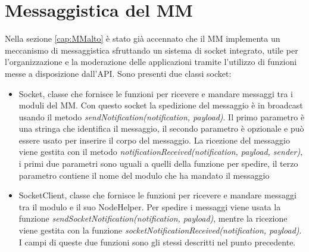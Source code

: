 \section{Messaggistica del MM}\label{cap:MMmess}
Nella sezione \ref{cap:MMalto} \`e stato gi\`a accennato che il MM implementa un meccanismo di messaggistica sfruttando un sistema di socket integrato,
utile per l'organizzazione e la moderazione delle applicazioni tramite l'utilizzo di funzioni messe a disposizione dall'API.
Sono presenti due classi socket:
\begin{itemize}
\item Socket, classe che fornisce le funzioni per ricevere e mandare messaggi tra i moduli del MM. Con questo socket la spedizione
del messaggio \`e in broadcast usando il metodo \textit{sendNotification(notification, payload)}. Il primo parametro \`e una stringa che identifica
il messaggio, il secondo parametro \`e opzionale e pu\`o essere usato per inserire il corpo del messaggio.
La ricezione del messaggio viene gestita con il metodo \textit{notificationReceived(notification, payload, sender)}, i primi due parametri sono
uguali a quelli della funzione per spedire, il terzo parametro contiene il nome del
modulo che ha mandato il messaggio
\item SocketClient, classe che fornisce le funzioni per ricevere e mandare messaggi tra il modulo e il suo NodeHelper. Per spedire
i messaggi viene usata la funzione \textit{sendSocketNotification(notification, payload)}, mentre la ricezione viene gestita con la funzione
 \textit{socketNotificationReceived(notification, payload)}. I campi di queste due funzioni sono gli stessi descritti nel punto precedente.\\[1\baselineskip]
\end{itemize}

